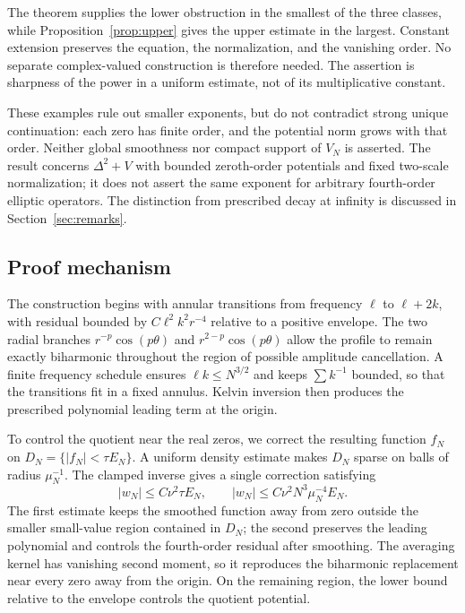 \documentclass[11pt,twoside,leqno]{article}
\numberwithin{equation}{section}
\theoremstyle{definition}
\theoremstyle{remark}
\begin{document}
The theorem supplies the lower obstruction in the smallest of the
three classes, while Proposition~\ref{prop:upper} gives the upper
estimate in the largest. Constant extension preserves the equation,
the normalization, and the vanishing order. No separate complex-valued
construction is therefore needed. The assertion is sharpness of the
power in a uniform estimate, not of its multiplicative constant.

These examples rule out smaller exponents, but do not contradict strong
unique continuation: each zero has finite order, and the potential norm
grows with that order. Neither global smoothness nor compact support
of $V_N$ is asserted. The result concerns $\Delta^2+V$ with bounded
zeroth-order potentials and fixed two-scale normalization; it does not
assert the same exponent for arbitrary fourth-order elliptic operators.
The distinction from prescribed decay at infinity is discussed in
Section~\ref{sec:remarks}.

\subsection{Proof mechanism}

The construction begins with annular transitions from frequency
$\ell$ to $\ell+2k$, with residual bounded by $C\ell^2k^2r^{-4}$
relative to a positive envelope. The two radial branches
$r^{-p}\cos(p\theta)$ and $r^{2-p}\cos(p\theta)$ allow the profile
to remain exactly biharmonic throughout the region of possible
amplitude cancellation. A finite frequency schedule ensures
$\ell k\le N^{3/2}$ and keeps $\sum k^{-1}$ bounded, so that the
transitions fit in a fixed annulus. Kelvin inversion then produces the
prescribed polynomial leading term at the origin.

To control the quotient near the real zeros, we correct the resulting
function $f_N$ on
$D_N=\{|f_N|<\tau E_N\}$. A uniform density estimate makes $D_N$ sparse on balls of radius
$\mu_N^{-1}$. The clamped inverse gives a single correction satisfying
\[
 |w_N|\le C\nu^2\tau E_N,
 \qquad
 |w_N|\le C\nu^2N^3\mu_N^{-4}E_N.
\]
The first estimate keeps the smoothed function away from zero outside
the smaller small-value region contained in $D_N$; the second preserves
the leading polynomial and controls the fourth-order residual after
smoothing. The averaging kernel has vanishing second moment, so it
reproduces the biharmonic replacement near every zero away from the
origin. On the remaining region, the lower bound relative to the
envelope controls the quotient potential.
\end{document}
